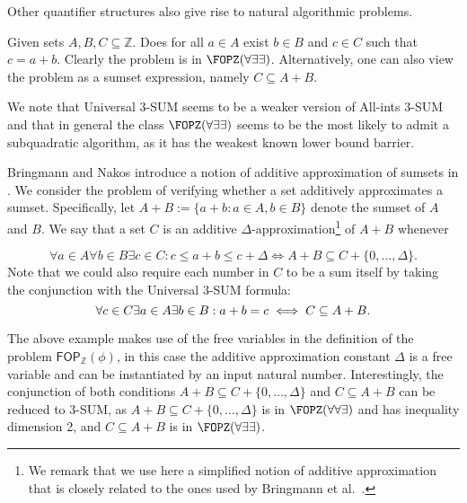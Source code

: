 Other quantifier structures also give rise to natural algorithmic problems. 

\begin{example}
Given sets $A,B,C \subseteq \mathbb{Z}$. Does for all $a \in A $ exist $b \in B$ and $c \in C$ such that 
$c=a+b$. Clearly the problem is in $\FOPZ(\forall \exists \exists)$. Alternatively, one can also view the problem as a sumset expression, namely
$C \subseteq A+B$.
\end{example}
We note that Universal $3$-SUM seems to be a weaker version of All-ints $3$-SUM and that in general the class $\FOPZ(\forall \exists \exists)$ seems
to be the most likely to admit a subquadratic algorithm, as it has the weakest known lower bound barrier.

\begin{example}\label{ex:addApx}
Bringmann and Nakos introduce a notion of additive approximation of sumsets in \cite{DBLP:conf/soda/BringmannN21}. We consider the problem of verifying whether a set additively approximates a sumset.  
	Specifically, let $A+B:=\{a +b: a \in A, b \in B\}$ denote the sumset of $A$ and $B$. We say that a set $C$ is an additive $\Delta$-approximation\footnote{We remark that we use here a simplified notion of additive approximation that is closely related to the ones used by Bringmann et al.~\cite{DBLP:conf/soda/BringmannN21}.} of $A+B$ whenever %

	\[
\forall a \in A \forall b  \in B\exists c \in C: c \leq a+b \leq c+\Delta \iff A+B \subseteq C+\{0,\dots,\Delta\}.
	\]
Note that we could also require each number in $C$ to be a sum itself by taking the conjunction with the Universal $3$-SUM formula:
	\[
		\forall c \in C \exists a \in A \exists b \in B: a+b=c \iff  C \subseteq A+B.\\
	\]
\end{example}
The above example makes use of the free variables in the definition of the problem $\mathsf{FOP}_{\mathbb{Z}}(\phi)$, in this case the additive approximation constant $\Delta$ is a free variable and can be instantiated by an input natural number.
Interestingly, the conjunction of both conditions $A+B \subseteq C+\{0,\dots,\Delta\}$ and $C \subseteq A+B$ can be reduced to $3$-SUM,
as $A+B \subseteq C+\{0,\dots,\Delta\}$ is in $\FOPZ(\forall \forall \exists)$ and has inequality dimension 2, and $C\subseteq A+B$ is in $\FOPZ(\forall \exists \exists)$.
